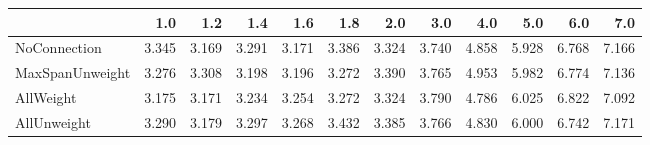 \begin{tabular}{lrrrrrrrrrrr}
\toprule
{} &   1.0 &   1.2 &   1.4 &   1.6 &   1.8 &   2.0 &   3.0 &   4.0 &   5.0 &   6.0 &   7.0 \\
\midrule
NoConnection    & 3.345 & 3.169 & 3.291 & 3.171 & 3.386 & 3.324 & 3.740 & 4.858 & 5.928 & 6.768 & 7.166 \\
MaxSpanUnweight & 3.276 & 3.308 & 3.198 & 3.196 & 3.272 & 3.390 & 3.765 & 4.953 & 5.982 & 6.774 & 7.136 \\
AllWeight       & 3.175 & 3.171 & 3.234 & 3.254 & 3.272 & 3.324 & 3.790 & 4.786 & 6.025 & 6.822 & 7.092 \\
AllUnweight     & 3.290 & 3.179 & 3.297 & 3.268 & 3.432 & 3.385 & 3.766 & 4.830 & 6.000 & 6.742 & 7.171 \\
\bottomrule
\end{tabular}
